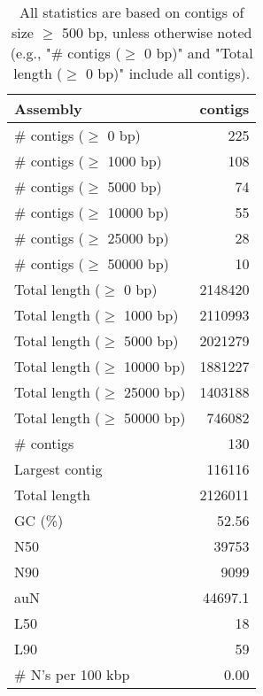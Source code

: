 \documentclass[12pt,a4paper]{article}
\begin{document}
\begin{table}[ht]
\begin{center}
\caption{All statistics are based on contigs of size $\geq$ 500 bp, unless otherwise noted (e.g., "\# contigs ($\geq$ 0 bp)" and "Total length ($\geq$ 0 bp)" include all contigs).}
\begin{tabular}{|l*{1}{|r}|}
\hline
Assembly & contigs \\ \hline
\# contigs ($\geq$ 0 bp) & 225 \\ \hline
\# contigs ($\geq$ 1000 bp) & 108 \\ \hline
\# contigs ($\geq$ 5000 bp) & 74 \\ \hline
\# contigs ($\geq$ 10000 bp) & 55 \\ \hline
\# contigs ($\geq$ 25000 bp) & 28 \\ \hline
\# contigs ($\geq$ 50000 bp) & 10 \\ \hline
Total length ($\geq$ 0 bp) & 2148420 \\ \hline
Total length ($\geq$ 1000 bp) & 2110993 \\ \hline
Total length ($\geq$ 5000 bp) & 2021279 \\ \hline
Total length ($\geq$ 10000 bp) & 1881227 \\ \hline
Total length ($\geq$ 25000 bp) & 1403188 \\ \hline
Total length ($\geq$ 50000 bp) & 746082 \\ \hline
\# contigs & 130 \\ \hline
Largest contig & 116116 \\ \hline
Total length & 2126011 \\ \hline
GC (\%) & 52.56 \\ \hline
N50 & 39753 \\ \hline
N90 & 9099 \\ \hline
auN & 44697.1 \\ \hline
L50 & 18 \\ \hline
L90 & 59 \\ \hline
\# N's per 100 kbp & 0.00 \\ \hline
\end{tabular}
\end{center}
\end{table}
\end{document}
